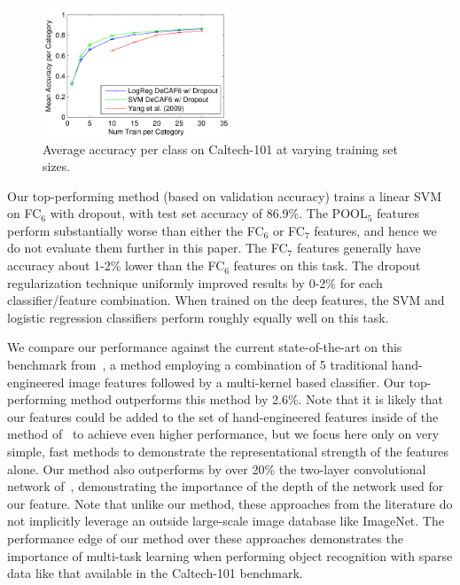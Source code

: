 \begin{figure}
  \centering
  \includegraphics[width=0.5\textwidth]{figs/decaf/caltech101_plot_numtrain.pdf}
  \caption{Average accuracy per class on Caltech-101 at varying training set sizes.}\label{fig:caltech101results}
\end{figure}

Our top-performing method (based on validation accuracy) trains a linear SVM on FC$_6$ with dropout, with test set accuracy of 86.9\%.
The POOL$_5$ features perform substantially worse than either the FC$_6$ or FC$_7$ features, and hence we do not evaluate them further in this paper.
The FC$_7$ features generally have accuracy about 1-2\% lower than the FC$_6$ features on this task.
The dropout regularization technique uniformly improved results by 0-2\% for each classifier/feature combination.
When trained on the deep features, the SVM and logistic regression classifiers perform roughly equally well on this task.

We compare our performance against the current state-of-the-art on this benchmark from~\cite{yang09}, a method employing a combination of 5 traditional hand-engineered image features followed by a multi-kernel based classifier.
Our top-performing method outperforms this method by 2.6\%. Note that it is likely that our features could be added to the set of hand-engineered features inside of the method of~\cite{yang09} to achieve even higher performance, but we focus here only on very simple, fast methods to demonstrate the representational strength of the features alone.
Our method also outperforms by over 20\% the two-layer convolutional network of~\cite{jarrett09}, demonstrating the importance of the depth of the network used for our feature.
Note that unlike our method, these approaches from the literature do not implicitly leverage an outside large-scale image database like ImageNet.
The performance edge of our method over these approaches demonstrates the importance of multi-task learning when performing object recognition with sparse data like that available in the Caltech-101 benchmark.


